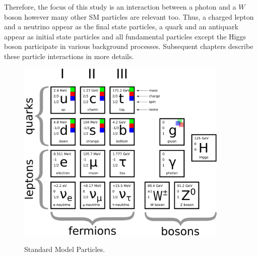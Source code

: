 Therefore, the focus of this study is an interaction between a photon and a $W$ boson however many other SM particles are relevant too. Thus, a charged lepton and a neutrino appear as the final state particles, a quark and an antiquark appear as initial state particles and all fundamental particles except the Higgs boson participate in various background processes. Subsequent chapters describe these particle interactions in more details.

\begin{figure}[htb]
  \begin{center}
    {\includegraphics[width=0.90\textwidth]{../figs/Intro/SMparticles.png}}
    \caption{Standard Model Particles.}
    \label{fig:SMtable}
  \end{center}
\end{figure}








